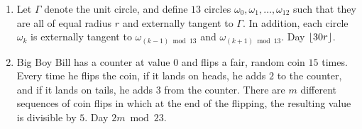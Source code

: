\begin{enumerate}
    \item Let \( \Gamma \) denote the unit circle, and define \( 13 \) circles
        \( \omega_0,\omega_1,\ldots,\omega_{12} \) such that they are all of
        equal radius \( r \) and externally tangent to \( \Gamma \).  In addition, each circle \(
        \omega_k \) is externally tangent to \( \omega_{(k - 1) \bmod{13}} \) and \( \omega_{(k
        + 1) \bmod{13}} \). Day \( \left\lfloor 30r \right\rfloor \).

    \item Big Boy Bill has a counter at value \( 0 \) and flips a fair, random
        coin \( 15 \) times. Every time he flips the coin, if it lands on
        heads, he adds \( 2 \) to the counter, and if it lands on tails, he
        adds \( 3 \) from the counter. There are \( m \) different sequences of
        coin flips in which at the end of the flipping, the resulting value is
        divisible by \( 5 \). Day \( 2m \bmod{23} \).
\end{enumerate}

